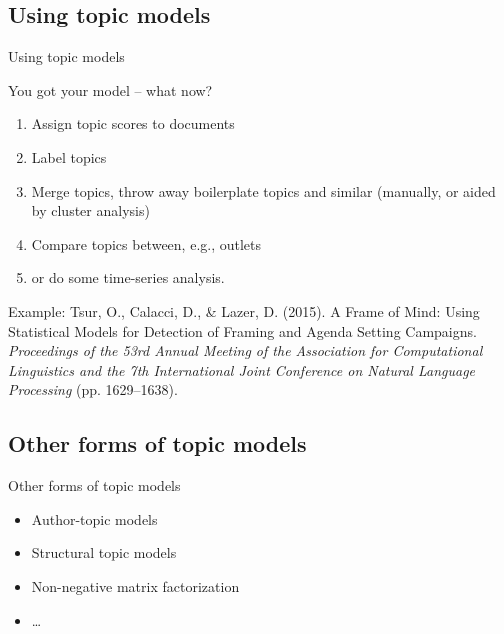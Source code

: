 \documentclass[compress]{beamer}
\begin{document}


\subsection{Using topic models}

\begin{frame}{Using topic models}

You got your model -- what now?

\begin{enumerate}
	\item Assign topic scores to documents
	\item Label topics
	\item Merge topics, throw away boilerplate topics and similar (manually, or aided by cluster analysis)
	\item Compare topics between, e.g., outlets
	\item or do some time-series analysis.
\end{enumerate}


Example:
\tiny{Tsur, O., Calacci, D., \& Lazer, D. (2015). A Frame of Mind: Using Statistical Models for Detection of Framing and Agenda Setting Campaigns. \textit{Proceedings of the 53rd Annual Meeting of the Association for Computational Linguistics and the 7th International Joint Conference on Natural Language Processing} (pp. 1629–1638).}



\end{frame}



\subsection{Other forms of topic models}

\begin{frame}{Other forms of topic models}
\begin{itemize}
	\item Author-topic models
	\item Structural topic models
	\item Non-negative matrix factorization
	\item \ldots
\end{itemize}
\end{frame}
\end{document}
